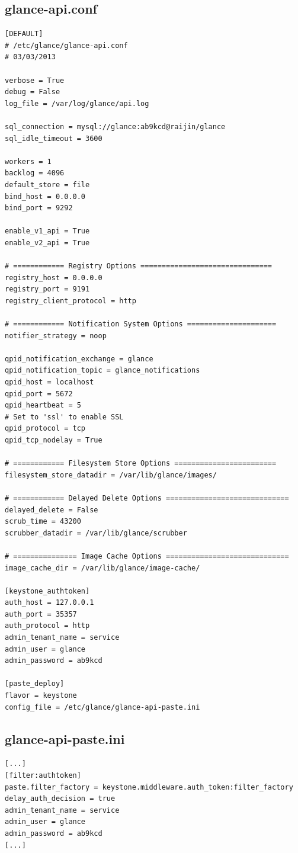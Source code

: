 \documentclass[a4paper,oneside]{report}
\begin{document}
\subsection{glance-api.conf}
\begin{verbatim}
[DEFAULT]
# /etc/glance/glance-api.conf
# 03/03/2013

verbose = True
debug = False
log_file = /var/log/glance/api.log

sql_connection = mysql://glance:ab9kcd@raijin/glance
sql_idle_timeout = 3600

workers = 1
backlog = 4096
default_store = file
bind_host = 0.0.0.0
bind_port = 9292

enable_v1_api = True
enable_v2_api = True

# ============ Registry Options ===============================
registry_host = 0.0.0.0
registry_port = 9191
registry_client_protocol = http

# ============ Notification System Options =====================
notifier_strategy = noop

qpid_notification_exchange = glance
qpid_notification_topic = glance_notifications
qpid_host = localhost
qpid_port = 5672
qpid_heartbeat = 5
# Set to 'ssl' to enable SSL
qpid_protocol = tcp
qpid_tcp_nodelay = True

# ============ Filesystem Store Options ========================
filesystem_store_datadir = /var/lib/glance/images/

# ============ Delayed Delete Options =============================
delayed_delete = False
scrub_time = 43200
scrubber_datadir = /var/lib/glance/scrubber

# =============== Image Cache Options =============================
image_cache_dir = /var/lib/glance/image-cache/

[keystone_authtoken]
auth_host = 127.0.0.1
auth_port = 35357
auth_protocol = http
admin_tenant_name = service
admin_user = glance
admin_password = ab9kcd

[paste_deploy]
flavor = keystone
config_file = /etc/glance/glance-api-paste.ini
\end{verbatim}

\subsection{glance-api-paste.ini}
\begin{verbatim}
[...]
[filter:authtoken]
paste.filter_factory = keystone.middleware.auth_token:filter_factory
delay_auth_decision = true
admin_tenant_name = service
admin_user = glance
admin_password = ab9kcd
[...]
\end{verbatim}
\end{document}

